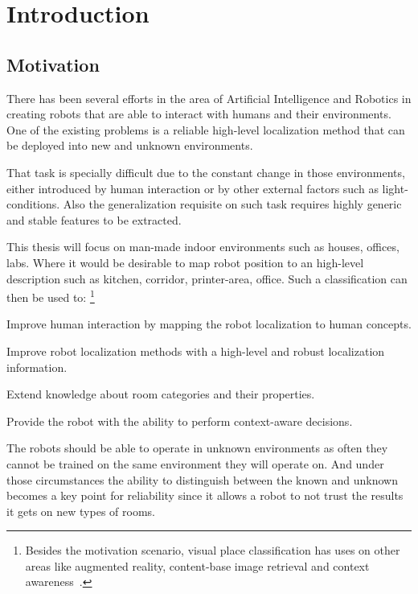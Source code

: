 \chapter{Introduction}
\label{chap:introduction}


\section{Motivation}
There has been several efforts in the area of Artificial Intelligence and Robotics in creating robots that are able to interact with humans and their environments.
One of the existing problems is a reliable high-level localization method that can be deployed into new and unknown environments.

That task is specially difficult due to the constant change in those environments, either introduced by human interaction or by other external factors such as light-conditions.
Also the generalization requisite on such task requires highly generic and stable features to be extracted.

This thesis will focus on man-made indoor environments such as houses, offices, labs.
Where it would be desirable to map robot position to an high-level description such as kitchen, corridor, printer-area, office.
Such a classification can then be used to:
\footnote{Besides the motivation scenario, visual place classification has uses on other areas like augmented reality, content-base image retrieval and context awareness~\citep{dey2000towards}.}
\begin{itemize*}
\item Improve human interaction by mapping the robot localization to human concepts.
\item Improve robot localization methods with a high-level and robust localization information.
\item Extend knowledge about room categories and their properties.
\item Provide the robot with the ability to perform context-aware decisions.
\end{itemize*}

The robots should be able to operate in unknown environments as often they cannot be trained on the same environment they will operate on.
And under those circumstances the ability to distinguish between the known and unknown becomes a key point for reliability since it allows a robot to not trust the results it gets on new types of rooms.


